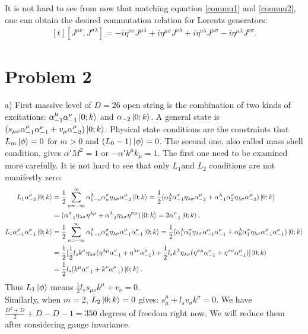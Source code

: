\documentclass[12pt]{article}
\begin{document}
It is not hard to see from now that matching equation \ref{commu1} and \ref{commu2}, one can obtain the desired commutation relation for Lorentz generators:
\begin{equation}
\begin{aligned}[t]
[J^{\mu\nu}, J^{\sigma\lambda}]=-i\eta^{\nu\sigma}J^{\mu\lambda}+i\eta^{\mu\sigma}J^{\nu\lambda}+i\eta^{\nu\lambda}J^{\mu\sigma}-i\eta^{\mu\lambda}J^{\nu\sigma}.
\end{aligned}
\end{equation}
\section{Problem 2}
\begin{paragraph}{a)}
First massive level of $D=26$ open string is the combination of two kinds of excitations: $\alpha_{-1}^\mu\alpha_{-1}^\nu\ket{0;k}$ and $\alpha_{-2}\ket{0;k}$. A general state is $(s_{\mu\nu}\alpha_{-1}^\mu\alpha_{-1}^\nu+v_\mu\alpha_{-2}^\mu)\ket{0;k}$. Physical state conditions are the constraints that $L_m\ket{\phi}=0$ for $m>0$ and $(L_0-1)\ket{\phi}=0$.  The second one, also called mass shell condition, gives $\alpha' M^2=1$ or $-\alpha' k^\mu k_\mu=1$. The first one need to be examined more carefully. It is not hard to see that only $L_1 \text{and } L_2$ conditions are not manifestly zero:
\begin{equation}
\begin{aligned}[t]
L_1\alpha_{-2}^\mu\ket{0;k}&=\frac{1}{2}\sum\limits_{n=-\infty}^\infty\alpha_{1-n}^\lambda\alpha_n^\sigma\eta_{\lambda\sigma}\alpha_{-2}^\mu\ket{0;k}=\frac{1}{2}(\alpha_{2}^\lambda\alpha_{-1}^\sigma\eta_{\lambda\sigma}\alpha_{-2}^\mu+\alpha_{-1}^\lambda\alpha_{2}^\sigma\eta_{\lambda\sigma}\alpha_{-2}^\mu)\ket{0;k}\\
&=(\alpha_{-1}^\sigma\eta_{\lambda\sigma}\eta^{\lambda\mu}+\alpha_{-1}^\lambda\eta_{\lambda\sigma}\eta^{\sigma\mu})\ket{0;k}=2\alpha_{-1}^{\mu}\ket{0;k},\\
L_1\alpha_{-1}^\mu\alpha_{-1}^\nu\ket{0;k}&=\frac{1}{2}\sum\limits_{n=-\infty}^\infty\alpha_{1-n}^\lambda\alpha_n^\sigma\eta_{\lambda\sigma}\alpha_{-1}^\mu\alpha_{-1}^\nu\ket{0;k}=\frac{1}{2}(\alpha_{1}^\lambda\alpha_0^\sigma\eta_{\lambda\sigma}\alpha_{-1}^\mu\alpha_{-1}^\nu+\alpha_{0}^\lambda\alpha_1^\sigma\eta_{\lambda\sigma}\alpha_{-1}^\mu\alpha_{-1}^\nu)\ket{0;k}\\
&=\frac{1}{2}[\frac{1}{2}l_s k^\sigma\eta_{\lambda\sigma}(\eta^{\lambda\mu}\alpha_{-1}^\nu+\eta^{\lambda\nu}\alpha_{-1}^\mu)+\frac{1}{2}l_s k^\lambda\eta_{\lambda\sigma}(\eta^{\sigma\mu}\alpha_{-1}^{\nu}+\eta^{\sigma\nu}\alpha_{-1}^{\mu})]\ket{0;k}\\
&=\frac{1}{2}l_s(k^\mu\alpha_{-1}^\nu+k^\nu\alpha_{-1}^\mu)\ket{0;k}.
\end{aligned}
\end{equation}
Thus $L_1\ket{\phi}$ means $\frac{1}{2}l_s s_{\mu\nu}k^\mu+v_\nu=0$. \\

Similarly, when $m=2$, $L_2\ket{0;k}=0$ gives: $s_{\mu}^\mu+l_s v_\sigma k^\sigma=0$. We have $\frac{D^2+D}{2}+D-D-1=350$ degrees of freedom right now. We will reduce them after considering gauge invariance.
\end{paragraph}
\end{document}
